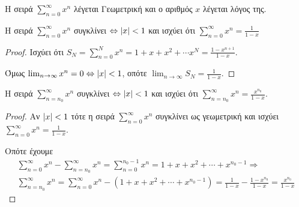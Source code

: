 \documentclass[a4paper,table]{report}
\begin{document}
Η σειρά $ \sum_{n=0}^{\infty} x^{n} $ λέγεται \textcolor{Col1}{Γεωμετρική} και ο αριθμός
$x$ λέγεται \textcolor{Col1}{λόγος} της.

\begin{mybox3}
\begin{prop}
Η σειρά $ \sum_{n=0}^{\infty} x^{n} $ συγκλίνει $ \Leftrightarrow \abs{x} < 1 $
και ισχύει ότι $ \sum_{n=0}^{\infty} x^{n} = \frac{1}{1-x} $
\end{prop}
\end{mybox3}
\begin{proof}
\item {}
    Ισχύει ότι $ S_{N} = \sum_{n=0}^{N} x^{n} =  1 + x + x^{2} + \cdots x^{N} = 
    \frac{1- x^{n+1}}{1-x} $.

    Όμως $ \lim_{n \to \infty} x^{n} = 0 \Leftrightarrow \abs{x} < 1 $, οπότε 
    $ \lim_{n \to \infty} S_{N} = \frac{1}{1-x} $.
\end{proof}

\begin{mybox3}
\begin{cor}
    Η σειρά $ \sum_{n= n_{0}}^{\infty} x^{n} $ συγκλίνει $ \Leftrightarrow \abs{x} <1 $
    και ισχύει ότι $ \sum_{n= n_{0}}^{\infty} x^{n} = \frac{x^{n_{0}}}{1-x} $.
\end{cor}
\end{mybox3}
\begin{proof}
\item {}
    Αν $ \abs{x} < 1 $ τότε η σειρά $ \sum_{n=0}^{\infty} x^{n} $ συγκλίνει ως 
    γεωμετρική και ισχύει $ \sum_{n=0}^{\infty} x^{n} = \frac{1}{1-x} $. 

    Οπότε έχουμε
    \begin{align*}
        \sum_{n=0}^{\infty} x^{n} - \sum_{n= n_{0}}^{\infty} x^{n} = 
        \sum_{n= 0}^{n_{0} -1} x^{n} = 1 + x + x^{2} + \cdots + x^{n_{0}-1} 
        \Rightarrow \\
        \sum_{n= n_{0}}^{\infty} x^{n} = \sum_{n=0}^{\infty} x^{n} - (1 + x + x^{2} + 
        \cdots + x^{n_{0}-1}) = \frac{1}{1-x} - \frac{1- x^{n_{0}}}{1-x} = 
        \frac{x^{n_{0}}}{1-x}  
    \end{align*} 
\end{proof}
\end{document}
